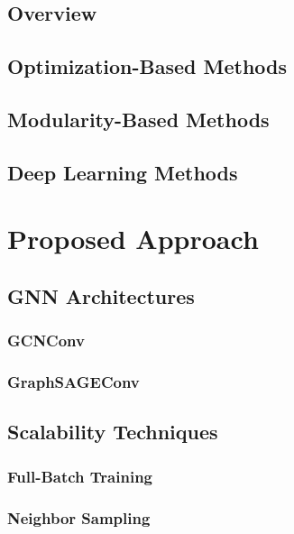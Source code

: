 \documentclass{article}
\begin{document}
\subsection{Overview}

\subsection{Optimization-Based Methods}


\subsection{Modularity-Based Methods}


\subsection{Deep Learning Methods}



\section{Proposed Approach}


\subsection{GNN Architectures}

\subsubsection{GCNConv}


\subsubsection{GraphSAGEConv}

\subsection{Scalability Techniques}

\subsubsection{Full-Batch Training}

\subsubsection{Neighbor Sampling}
\end{document}
